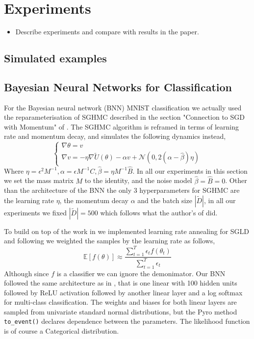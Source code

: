 
\section{Experiments}

\begin{itemize}
    \item Describe experiments and compare with results in the paper.
\end{itemize}

\subsection{Simulated examples}

\subsection{Bayesian Neural Networks for Classification}
For the Bayesian neural network (BNN) MNIST classification we actually used the reparameterisation of SGHMC described in the section "Connection to SGD with Momentum" of \cite{sghmc}. The SGHMC algorithm is reframed in terms of learning rate and momentum decay, and simulates the following dynamics instead,
$$\begin{cases}
\nabla \theta = v\\
\nabla v = - \eta \nabla \tilde{U}(\theta) - \alpha v + \mathcal{N}(0, 2(\alpha - \hat{\beta}) \eta)
\end{cases}
$$
Where $\eta = \epsilon^2 M^{-1}, \alpha = \epsilon M^{-1}C, \hat{\beta} = \eta M^{-1}\hat{B}$. In all our experiments in this section we set the mass matrix $M $ to the identity, and the noise model $\hat{\beta} = \hat{B} = 0$. Other than the architecture of the BNN the only 3 hyperparameters for SGHMC are the learning rate $\eta$, the momentum decay $\alpha$ and the batch size $|\tilde{D}|$, in all our experiments we fixed $|\tilde{D}| = 500$ which follows what the author's of \cite{sghmc} did. 

To build on top of the work in \cite{sghmc} we implemented learning rate annealing for SGLD and following \cite{sgld} we weighted the samples by the learning rate as follows,
$$\mathbb{E}[f(\theta)] \approx \frac{\sum^T_{t=1} \epsilon_t f(\theta_t)}{\sum^T_{t=1} \epsilon_t}$$
Although since $f$ is a classifier we can ignore the demonimator. Our BNN followed the same architecture as in \cite{sghmc}, that is one linear with 100 hidden units followed by ReLU activation followed by another linear layer and a log softmax for multi-class classification. The weights and biases for both linear layers are sampled from univariate standard normal distributions, but the Pyro method \texttt{to\_event()} declares dependence between the parameters. The likelihood function is of course a Categorical distribution.

